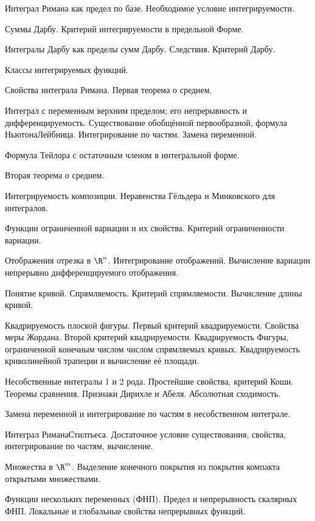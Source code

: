 \documentclass[a4paper]{article}
\begin{document}
\begin{nums}{-2}
\item Интеграл Римана как предел по базе. Необходимое условие интегрируемости.
\item Суммы Дарбу.  Критерий интегрируемости в предельной  Форме.
\item Интегралы Дарбу как пределы сумм Дарбу. Следствия. Критерий Дарбу.
\item Классы интегрируемых функций.
\item Свойства интеграла Римана. Первая теорема о среднем.
\item Интеграл с переменным верхним пределом; его непрерывность и дифференцируемость.
Существование обобщённой первообразной, формула Ньютона\ч Лейбница. Интегрирование по частям. Замена
переменной.
\item Формула Тейлора с остаточным членом в интегральной форме.
\item Вторая теорема о среднем.
\item Интегрируемость композиции. Неравенства Гёльдера и Минковского для интегралов.
\item Функции ограниченной вариации и их свойства. Критерий ограниченности вариации.
\item Отображения отрезка в $\R^n$. Интегрирование отображений. Вычисление вариации
непрерывно дифференцируемого отображения.
\item Понятие кривой. Спрямляемость.  Критерий спрямляемости. Вычисление длины кривой.
\item Квадрируемость плоской фигуры. Первый критерий квадрируемости. Свойства меры Жордана.
Второй критерий квадрируемости. Квадрируемость Фигуры, ограниченной конечным числом числом спрямляемых кривых.
Квадрируемость криволинейной трапеции и вычисление её площади.
\item Несобственные интегралы 1 и 2 рода. Простейшие свойства, критерий Коши. Теоремы сравнения.
Признаки Дирихле и Абеля. Абсолютная сходимость.
\item Замена переменной и интегрирование по частям в несобственном интеграле.
\item Интеграл Римана\ч Стилтьеса. Достаточное условие существования, свойства, интегрирование по частям, вычисление.
\item Множества в $\R^m$. Выделение конечного покрытия из покрытия компакта открытыми множествами.
\item Функции нескольких переменных (ФНП). Предел и непрерывность скалярных ФНП. Локальные и
глобальные свойства непрерывных функций.

\end{nums}
\end{document}
